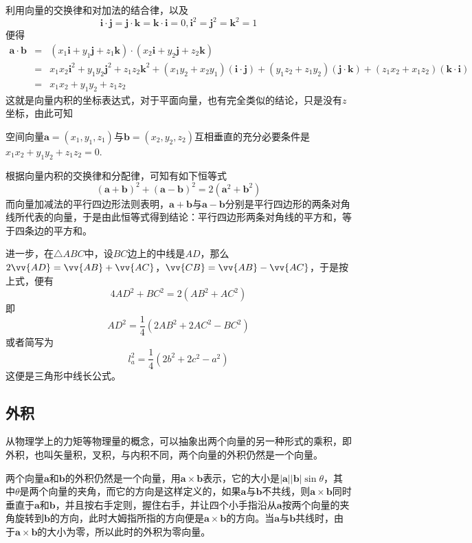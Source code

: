 利用向量的交换律和对加法的结合律，以及
\[ \bm{i} \cdot \bm{j} = \bm{j} \cdot \bm{k} = \bm{k} \cdot \bm{i} = 0, \bm{i}^2 = \bm{j}^2 = \bm{k}^2=1 \]
便得
\begin{eqnarray*}
  \bm{a} \cdot \bm{b} & = & (x_1 \bm{i} + y_1 \bm{j} + z_1 \bm{k}) \cdot (x_2 \bm{i} + y_2 \bm{j} + z_2 \bm{k}) \\
                      & = & x_1x_2 \bm{i}^2 + y_1y_2 \bm{j}^2 + z_1z_2 \bm{k}^2 + (x_1y_2+x_2y_1)(\bm{i} \cdot \bm{j}) + (y_1z_2+z_1y_2)(\bm{j} \cdot \bm{k}) + (z_1x_2 + x_1z_2)(\bm{k} \cdot \bm{i}) \\
  & = & x_1x_2 + y_1y_2+z_1z_2
\end{eqnarray*}
这就是向量内积的坐标表达式，对于平面向量，也有完全类似的结论，只是没有$z$坐标，由此可知

\begin{theorem}
  空间向量$\bm{a}=(x_1,y_1,z_1)$与$\bm{b} = (x_2,y_2,z_2)$互相垂直的充分必要条件是$x_1x_2+y_1y_2+z_1z_2=0$.
\end{theorem}

\begin{example}
  根据向量内积的交换律和分配律，可知有如下恒等式
  \[ (\bm{a}+\bm{b})^2 + (\bm{a}-\bm{b})^2 = 2(\bm{a}^2+\bm{b}^2) \]
而向量加减法的平行四边形法则表明，$\bm{a+b}$与$\bm{a-b}$分别是平行四边形的两条对角线所代表的向量，于是由此恒等式得到结论：平行四边形两条对角线的平方和，等于四条边的平方和。

进一步，在$\triangle ABC$中，设$BC$边上的中线是$AD$，那么$2\vv{AD}=\vv{AB}+\vv{AC}$，$\vv{CB}=\vv{AB}-\vv{AC}$，于是按上式，便有
\[ 4AD^2+BC^2=2(AB^2+AC^2) \]
即
\[ AD^2 = \frac{1}{4}(2AB^2+2AC^2-BC^2) \]
或者简写为
\[ l_a^2 = \frac{1}{4}(2b^2+2c^2-a^2) \]
这便是三角形中线长公式。
\end{example}


\subsection{外积}
\label{sec:outer-product-of-vectors}

从物理学上的力矩等物理量的概念，可以抽象出两个向量的另一种形式的乘积，即外积，也叫矢量积，叉积，与内积不同，两个向量的外积仍然是一个向量。

\begin{definition}
  两个向量$\bm{a}$和$\bm{b}$的外积仍然是一个向量，用$\bm{a}\times\bm{b}$表示，它的大小是$|\bm{a}||\bm{b}|\sin{\theta}$，其中$\theta$是两个向量的夹角，而它的方向是这样定义的，如果$\bm{a}$与$\bm{b}$不共线，则$\bm{a}\times\bm{b}$同时垂直于$\bm{a}$和$\bm{b}$，并且按右手定则，握住右手，并让四个小手指沿从$\bm{a}$按两个向量的夹角旋转到$\bm{b}$的方向，此时大姆指所指的方向便是$\bm{a}\times\bm{b}$的方向。当$\bm{a}$与$\bm{b}$共线时，由于$\bm{a}\times\bm{b}$的大小为零，所以此时的外积为零向量。
\end{definition}

